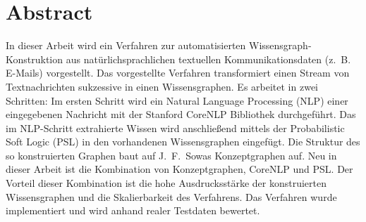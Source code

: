 %
\chapter*{Abstract}%
\label{sec:abstract}
\vspace*{-10mm}

In dieser Arbeit wird ein Verfahren zur automatisierten Wissensgraph-Konstruktion aus natürlichsprachlichen textuellen Kommunikationsdaten (z.~B. E-Mails) vorgestellt.
Das vorgestellte Verfahren transformiert einen Stream von Textnachrichten sukzessive in einen Wissensgraphen.
Es arbeitet in zwei Schritten:
Im ersten Schritt wird ein Natural Language Processing (NLP) einer eingegebenen Nachricht mit der Stanford CoreNLP Bibliothek durchgeführt.
Das im NLP-Schritt extrahierte Wissen wird anschließend mittels der Probabilistic Soft Logic (PSL) in den vorhandenen Wissensgraphen eingefügt.
Die Struktur des so konstruierten Graphen baut auf J.~F.~Sowas Konzeptgraphen auf.
Neu in dieser Arbeit ist die Kombination von Konzeptgraphen, CoreNLP und PSL.\@
Der Vorteil dieser Kombination ist die hohe Ausdrucksstärke der konstruierten Wissensgraphen und die Skalierbarkeit des Verfahrens.
Das Verfahren wurde implementiert und wird anhand realer Testdaten bewertet.
